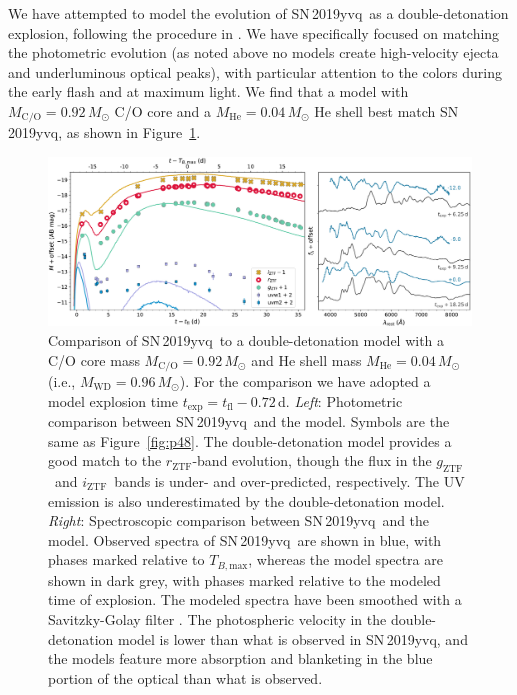 \documentclass[twocolumn]{aastex63}
\newcommand{\rztf}{$r_\mathrm{ZTF}$}
\newcommand{\gztf}{$g_\mathrm{ZTF}$}
\newcommand{\iztf}{$i_\mathrm{ZTF}$}
\newcommand{\tbmax}{$T_{B,\mathrm{max}}$}
\newcommand{\sn}{SN\,2019yvq}
\begin{document}
We have attempted to model the evolution of \sn\ as a double-detonation
explosion, following the procedure in \citet{Polin19}. We have specifically
focused on matching the photometric evolution (as noted above no models create
high-velocity ejecta and underluminous optical peaks), with particular
attention to the colors during the early flash and at maximum light. We find
that a model with $M_\mathrm{C/O} = 0.92\,M_\odot$ C/O core and a
$M_\mathrm{He} = 0.04\,M_\odot$ He shell best match \sn, as shown in
Figure~\ref{fig:double_det}.

\begin{figure}
    \centering
    \includegraphics[width=\textwidth]{./figures/double_det.pdf}
    \caption{Comparison of \sn\ to a double-detonation model with a C/O core
    mass $M_\mathrm{C/O} = 0.92\,M_\odot$ and He shell mass $M_\mathrm{He} =
    0.04\,M_\odot$ (i.e., $M_\mathrm{WD} = 0.96\,M_\odot$). For the comparison
    we have adopted a model explosion time $t_\mathrm{exp} = t_\mathrm{fl} -
    0.72$\,d. \textit{Left}: Photometric comparison between \sn\ and the
    model. Symbols are the same as Figure~\ref{fig:p48}. The double-detonation
    model provides a good match to the \rztf-band evolution, though the flux
    in the \gztf\ and \iztf\ bands is under- and over-predicted, respectively.
    The UV emission is also underestimated by the double-detonation model.
    \textit{Right}: Spectroscopic comparison between \sn\ and the model.
    Observed spectra of \sn\ are shown in blue, with phases marked relative to
    \tbmax, whereas the model spectra are shown in dark grey, with phases
    marked relative to the modeled time of explosion. The modeled spectra
    have been smoothed with a Savitzky-Golay filter \citep{Savitzky64}. The
    photospheric velocity in the double-detonation model is lower than what is
    observed in \sn, and the models feature more absorption and blanketing in
    the blue portion of the optical than what is observed. }
    \label{fig:double_det}
\end{figure}
\end{document}
